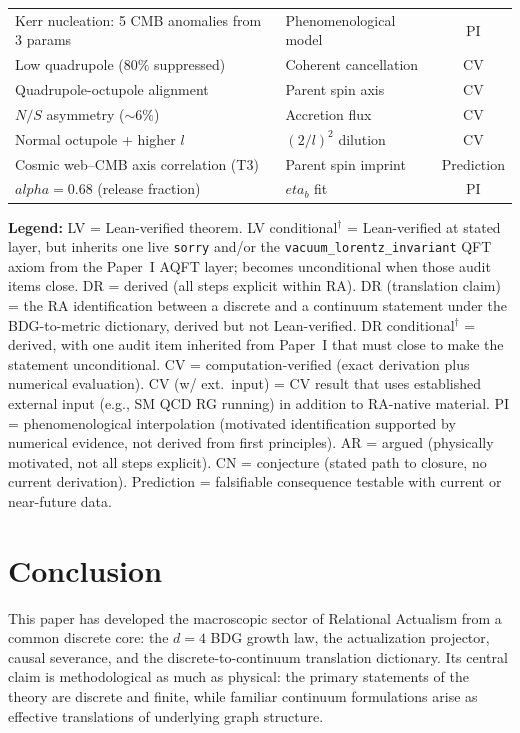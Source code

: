 \documentclass[11pt]{article}
\def\ell{l}%
\def\alpha{alpha}%
\def\eta{eta}%
\begin{document}
\begin{center}
\begin{tabular}{llc}
Kerr nucleation: 5 CMB anomalies from 3 params & Phenomenological model & PI \\
Low quadrupole ($80\%$ suppressed) & Coherent cancellation & CV \\
Quadrupole-octupole alignment & Parent spin axis & CV \\
$N/S$ asymmetry ($\sim 6\%$) & Accretion flux & CV \\
Normal octupole + higher $\ell$ & $(2/\ell)^2$ dilution & CV \\
Cosmic web--CMB axis correlation (T3) & Parent spin imprint & Prediction \\
$\alpha=0.68$ (release fraction) & $\eta_b$ fit & PI \\
\bottomrule
\end{tabular}
\end{center}

\textbf{Legend:} LV = Lean-verified theorem. LV conditional$^\dagger$ = Lean-verified at stated layer, but inherits one live \texttt{sorry} and/or the \texttt{vacuum\_lorentz\_invariant} QFT axiom from the Paper~I AQFT layer; becomes unconditional when those audit items close. DR = derived (all steps explicit within RA). DR (translation claim) = the RA identification between a discrete and a continuum statement under the BDG-to-metric dictionary, derived but not Lean-verified. DR conditional$^\dagger$ = derived, with one audit item inherited from Paper~I that must close to make the statement unconditional. CV = computation-verified (exact derivation plus numerical evaluation). CV (w/ ext.\ input) = CV result that uses established external input (e.g., SM QCD RG running) in addition to RA-native material. PI = phenomenological interpolation (motivated identification supported by numerical evidence, not derived from first principles). AR = argued (physically motivated, not all steps explicit). CN = conjecture (stated path to closure, no current derivation). Prediction = falsifiable consequence testable with current or near-future data.

\section{Conclusion}
\label{sec:conclusion}

This paper has developed the macroscopic sector of Relational Actualism from a common discrete core: the $d=4$ BDG growth law, the actualization projector, causal severance, and the discrete-to-continuum translation dictionary. Its central claim is methodological as much as physical: the primary statements of the theory are discrete and finite, while familiar continuum formulations arise as effective translations of underlying graph structure.
\end{document}
